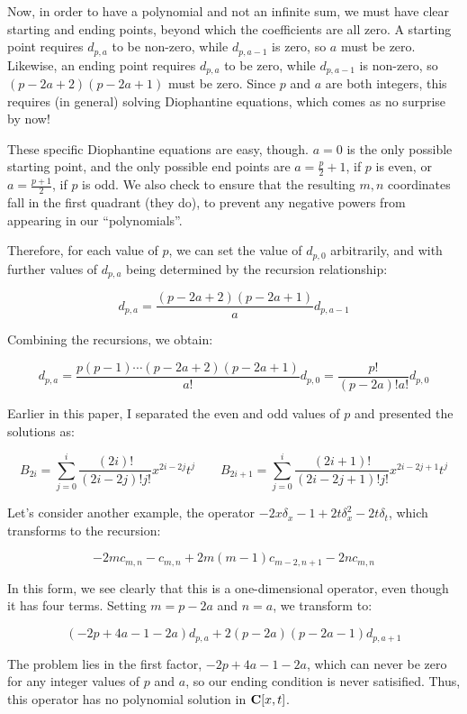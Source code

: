\documentclass{article}
\newcommand{\C}{\ensuremath{{\bf C}}}
\begin{document}
Now, in order to have a polynomial and not an infinite sum, we must
have clear starting and ending points, beyond which the coefficients
are all zero.  A starting point requires $d_{p,a}$ to be non-zero,
while $d_{p,a-1}$ is zero, so $a$ must be zero.  Likewise, an ending
point requires $d_{p,a}$ to be zero, while $d_{p,a-1}$ is non-zero,
so $(p-2a+2)(p-2a+1)$ must be zero.  Since $p$ and $a$ are both
integers, this requires (in general) solving Diophantine equations,
which comes as no surprise by now!

These specific Diophantine equations are easy, though.  $a=0$ is the
only possible starting point, and the only possible end points are
$a=\frac{p}{2}+1$, if $p$ is even, or $a=\frac{p+1}{2}$, if $p$ is
odd.  We also check to ensure that the resulting $m,n$ coordinates
fall in the first quadrant (they do), to prevent any negative powers
from appearing in our ``polynomials''.

Therefore, for each value of $p$, we can set the value of $d_{p,0}$
arbitrarily, and with further values of $d_{p,a}$ being determined
by the recursion relationship:

$$d_{p,a} = \frac{(p-2a+2)(p-2a+1)}{a} d_{p,a-1}$$

Combining the recursions, we obtain:

$$d_{p,a} = \frac{p(p-1)\cdots(p-2a+2)(p-2a+1)}{a!} d_{p,0} = \frac{p!}{(p-2a)!a!} d_{p,0}$$

Earlier in this paper, I separated the even and odd values of $p$ and presented the solutions as:

$$B_{2i} = \sum_{j=0}^i \frac{(2i)!}{(2i-2j)!j!} x^{2i-2j} t^{j}
\qquad B_{2i+1} = \sum_{j=0}^i \frac{(2i+1)!}{(2i-2j+1)!j!} x^{2i-2j+1} t^{j}$$

Let's consider another example, the operator $-2x\delta_x - 1 +2t\delta_x^2 - 2t\delta_t$,
which transforms to the recursion:

$$-2m c_{m,n} - c_{m,n} + 2m(m-1)c_{m-2,n+1} - 2nc_{m,n}$$

In this form, we see clearly that this is a one-dimensional operator, even though it
has four terms.  Setting $m=p-2a$ and $n=a$, we transform to:

$$(-2p+4a-1-2a)d_{p,a} + 2(p-2a)(p-2a-1)d_{p,a+1}$$

The problem lies in the first factor, $-2p+4a-1-2a$, which can never be zero for
any integer values of $p$ and $a$, so our ending condition is never satisified.
Thus, this operator has no polynomial solution in $\C[x,t]$.
\end{document}
